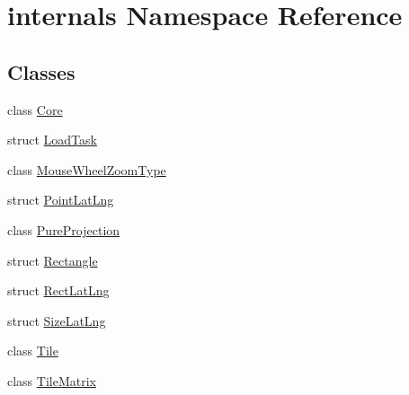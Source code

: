\hypertarget{namespaceinternals}{\section{internals Namespace Reference}
\label{namespaceinternals}
}
\subsection*{Classes}
\begin{DoxyCompactItemize}
\item 
class \hyperlink{classinternals_1_1_core}{Core}
\item 
struct \hyperlink{structinternals_1_1_load_task}{Load\-Task}
\item 
class \hyperlink{classinternals_1_1_mouse_wheel_zoom_type}{Mouse\-Wheel\-Zoom\-Type}
\item 
struct \hyperlink{structinternals_1_1_point_lat_lng}{Point\-Lat\-Lng}
\item 
class \hyperlink{classinternals_1_1_pure_projection}{Pure\-Projection}
\item 
struct \hyperlink{structinternals_1_1_rectangle}{Rectangle}
\item 
struct \hyperlink{structinternals_1_1_rect_lat_lng}{Rect\-Lat\-Lng}
\item 
struct \hyperlink{structinternals_1_1_size_lat_lng}{Size\-Lat\-Lng}
\item 
class \hyperlink{classinternals_1_1_tile}{Tile}
\item 
class \hyperlink{classinternals_1_1_tile_matrix}{Tile\-Matrix}
\end{DoxyCompactItemize}
